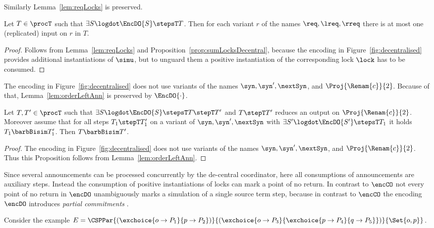 \documentclass[]{eptcs}
\begin{document}
Similarly Lemma~\ref{lem:reqLocks} is preserved.

\begin{prop}
	Let $ T \in \procT $ such that $ \exists S\logdot \EncDO{S} \stepsT T $. Then for each variant $ r $ of the names $ \req, \lreq, \rreq $ there is at most one (replicated) input on $ r $ in $ T $.
	\label{prop:reqLocksDecentral}
\end{prop}

\begin{proof}
	Follows from Lemma~\ref{lem:reqLocks} and Proposition~\ref{prop:sumLocksDecentral}, because the encoding in Figure~\ref{fig:decentralised} provides additional instantiations of $ \simu $, but to unguard them a positive instantiation of the corresponding lock $ \lock $ has to be consumed.
\end{proof}

The encoding in Figure~\ref{fig:decentralised} does not use variants of the names $ \syn, \syn', \nextSyn $, and $ \Proj{\Renam{c}}{2} $. Because of that, Lemma~\ref{lem:orderLeftAnn} is preserved by $ \EncDO{\cdot} $.

\begin{prop}
	Let $ T, T' \in \procT $ such that $ \exists S\logdot \EncDO{S} \stepsT T \stepT T' $ and $ T \stepT T' $ reduces an output on $ \Proj{\Renam{c}}{2} $. Moreover assume that for all steps $ T_1 \stepT T_1' $ on a variant of $ \syn, \syn', \nextSyn $ with $ \exists S'\logdot \EncDO{S'} \stepsT T_1 $ it holds $ T_1 \barbBisim T_1' $.
	Then $ T \barbBisim T' $.
	\label{prop:orderLeftAnnDecentral}
\end{prop}

\begin{proof}
	The encoding in Figure~\ref{fig:decentralised} does not use variants of the names $ \syn, \syn', \nextSyn $, and $ \Proj{\Renam{c}}{2} $. Thus this Proposition follows from Lemma~\ref{lem:orderLeftAnn}.
\end{proof}

Since several announcements can be processed concurrently by the de-central coordinator, here all consumptions of announcements are auxiliary steps. Instead the consumption of positive instantiations of locks can mark a point of no return. In contrast to $ \encCO $ not every point of no return in $ \encDO $ unambiguously marks a simulation of a single source term step, because in contrast to $ \encCO $ the encoding $ \encDO $ introduces \emph{partial commitments} \cite{peters12,petersNestmann12}.

Consider the example $ E = \CSPPar{\left( \exchoice{o \to P_1}{p \to P_2} \right)}{\left( \exchoice{o \to P_3}{\exchoice{p \to P_4}{q \to P_5}} \right)}{\Set{ o, p }} $.
\end{document}

